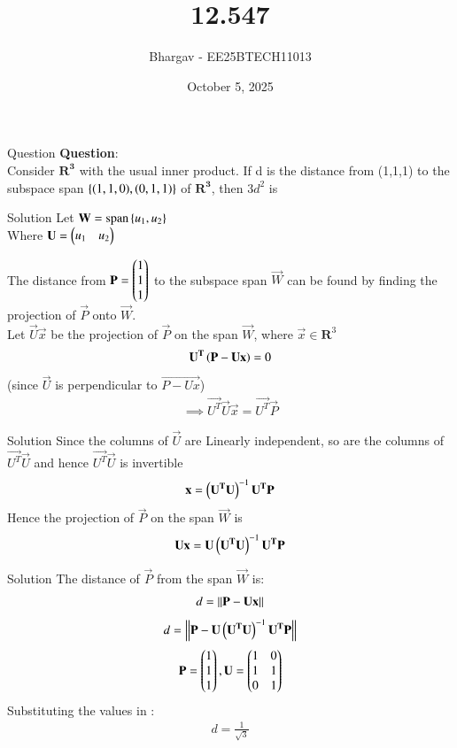 \documentclass{beamer}
\title{12.547}
\date{October 5, 2025}
\author{Bhargav - EE25BTECH11013}
\begin{document}
\frame{\titlepage}

\begin{frame}{Question}
\textbf{Question}: \\
Consider $\mathbf{R^3}$ with the usual inner product. If d  is the distance from (1,1,1) to the subspace span $\left\{(1,1,0), (0,1,1)\right\}$ of $\mathbf{R^3}$, then $3d^2$ is
\end{frame}
\begin{frame}{Solution}
Let
$\mathbf{W} = \operatorname{span}\left\{u_1, u_2\right\}$\\
Where $\mathbf{U} = \begin{pmatrix}u_1 & u_2\end{pmatrix}$ 

The distance from $\mathbf{P} = \begin{pmatrix}1 \\ 1 \\ 1\end{pmatrix}$ to the subspace span $\vec{W}$ can be found by finding the projection of $\vec{P}$ onto $\vec{W}$.\\

 Let $\vec{U}\vec{x}$ be the projection of $\vec{P}$ on the span $\vec{W}$, where $\vec{x} \in \mathbf{R}^3$
\begin{align}
\mathbf{U^T}\left(\mathbf{P-Ux}\right)=0
\end{align}
(since $\vec{U}$ is perpendicular to $\vec{P-Ux}$)
\begin{align}
\implies \vec{U^T}\vec{U}\vec{x} = \vec{U^T}\vec{P}
\end{align}
\end{frame}

\begin{frame}{Solution}
Since the columns of $\vec{U}$ are Linearly independent, so are the columns of $\vec{U^T}\vec{U}$ and hence $\vec{U^T}\vec{U}$ is invertible 
\begin{align}
\mathbf{x} = \left(\mathbf{U^T}\mathbf{U}\right)^{-1} \mathbf{U^T}\mathbf{P}
\end{align}
Hence the projection of $\vec{P}$ on the span $\vec{W}$ is
\begin{align}
\mathbf{U}\mathbf{x} = \mathbf{U}\left(\mathbf{U^T}\mathbf{U}\right)^{-1} \mathbf{U^T}\mathbf{P}
\end{align}
\end{frame}

\begin{frame}{Solution}
The distance of $\vec{P}$ from the span $\vec{W}$ is:
\begin{align}
d = \left\lVert\mathbf{P} - \mathbf{U}\mathbf{x}\right\rVert
\end{align}
\begin{align}
d = \left\lVert\mathbf{P} - \mathbf{U}\left(\mathbf{U^T}\mathbf{U}\right)^{-1} \mathbf{U^T}\mathbf{P}\right\rVert
\end{align}
\begin{align}
\mathbf{P} = \begin{pmatrix}1 \\ 1 \\ 1\end{pmatrix}, \mathbf{U} = \begin{pmatrix}1 & 0 \\ 1 & 1 \\ 0 & 1\end{pmatrix}
\end{align}
Substituting the values in :
\begin{align}
d = \frac{1}{\sqrt{3}}
\end{align}


\end{frame}
\end{document}
